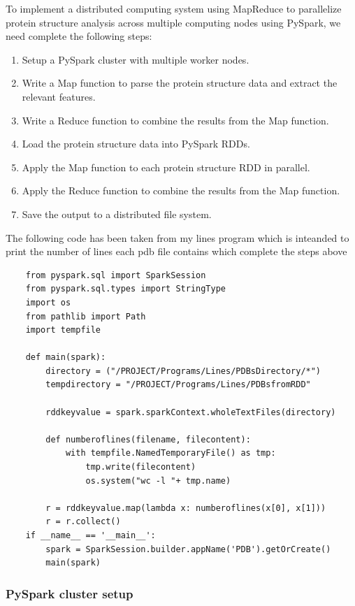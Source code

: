 \documentclass[]{final_report}
\begin{document}
To implement a distributed computing system using MapReduce to parallelize protein structure analysis across multiple computing nodes using PySpark, we need complete the following steps:

\begin{enumerate}
    \item Setup a PySpark cluster with multiple worker nodes.
    \item Write a Map function to parse the protein structure data and extract the relevant features.
    \item Write a Reduce function to combine the results from the Map function.
    \item Load the protein structure data into PySpark RDDs.
    \item Apply the Map function to each protein structure RDD in parallel.
    \item Apply the Reduce function to combine the results from the Map function.
    \item Save the output to a distributed file system.
\end{enumerate}

The following code has been taken from my lines program which is inteanded to print the number of lines each pdb file contains which complete the steps above

\begin{lstlisting}
    from pyspark.sql import SparkSession
    from pyspark.sql.types import StringType
    import os
    from pathlib import Path
    import tempfile

    def main(spark):
        directory = ("/PROJECT/Programs/Lines/PDBsDirectory/*")
        tempdirectory = "/PROJECT/Programs/Lines/PDBsfromRDD"

        rddkeyvalue = spark.sparkContext.wholeTextFiles(directory)

        def numberoflines(filename, filecontent):
            with tempfile.NamedTemporaryFile() as tmp:
                tmp.write(filecontent)
                os.system("wc -l "+ tmp.name)

        r = rddkeyvalue.map(lambda x: numberoflines(x[0], x[1]))
        r = r.collect()
    if __name__ == '__main__':
        spark = SparkSession.builder.appName('PDB').getOrCreate()
        main(spark)

\end{lstlisting}

\clearpage

\subsubsection{PySpark cluster setup}
\end{document}
